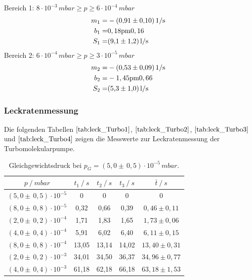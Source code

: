 Bereich 1: $8 \cdot 10^{-3} \, \si{mbar} \geq p \geq 6 \cdot 10^{-4} \, \si{mbar}$\\
\begin{align*}
	m_1=& -\SI{0,91 \pm 0,10}{1/s}\\
	b_1=& \si{0,18 \pm 0,16}\\
	S_1=& \SI{9,1 \pm 1,2}{l/s}
\end{align*}
Bereich 2: $6 \cdot 10^{-4} \, \si{mbar} \geq p \geq 3 \cdot 10^{-5} \, \si{mbar}$\\
\begin{align*}
	m_2=& -\SI{0,53 \pm 0,09}{1/s}\\
	b_2=& -\si{1,45 \pm 0,66}\\
	S_2=& \SI{5,3 \pm 1,0}{l/s}
\end{align*}

\subsubsection{Leckratenmessung}
Die folgenden Tabellen $\ref{tab:leck_Turbo1}$, $\ref{tab:leck_Turbo2}$, $\ref{tab:leck_Turbo3}$ und $\ref{tab:leck_Turbo4}$ zeigen die Messwerte zur Leckratenmessung der Turbomolekularpumpe.

\begin{table}[H]
\centering
\begin{tabular}{c|c|c|c|c}
	{$p \:/\: \si{mbar}$} & {$t_1 \:/\: \si{s} $} & {$t_2 \:/\: \si{s} $} & {$t_3 \:/\: \si{s} $} & {$\bar{t} \:/\: \si{s}$}\\
\midrule
$(5,0 \pm \, 0,5)\cdot 10^{-5}$ &0 &0 &0 &0\\
$(8,0 \pm \, 0,8)\cdot 10^{-5}$ &   0,32 &  0,66 &  0,39 & $0,46 \pm 0,11$\\
$(2,0 \pm \, 0,2)\cdot 10^{-4}$ &   1,71  &  1,83 &  1,65 & $1,73 \pm 0,06$\\
$(4,0 \pm \, 0,4)\cdot 10^{-4}$ &   5,91 &  6,02 &  6,40 & $6,11 \pm 0,15$\\
$(8,0 \pm \, 0,8)\cdot 10^{-4}$ &   13,05 &  13,14 &  14,02 & $13,40 \pm 0,31$\\
$(2,0 \pm \, 0,2)\cdot 10^{-3}$ &   34,01 &  34,50 &  36,37 & $34,96 \pm 0,77$\\
$(4,0 \pm \, 0,4)\cdot 10^{-3}$ &  61,18 & 62,18 & 66,18 & $63,18 \pm 1,53$\\
\end{tabular}
\caption{Gleichgewichtsdruck bei $p_G=(5,0 \pm \, 0,5)\cdot 10^{-5} \, \si{mbar}$.}
\label{tab:leck_Turbo1}
\end{table}


